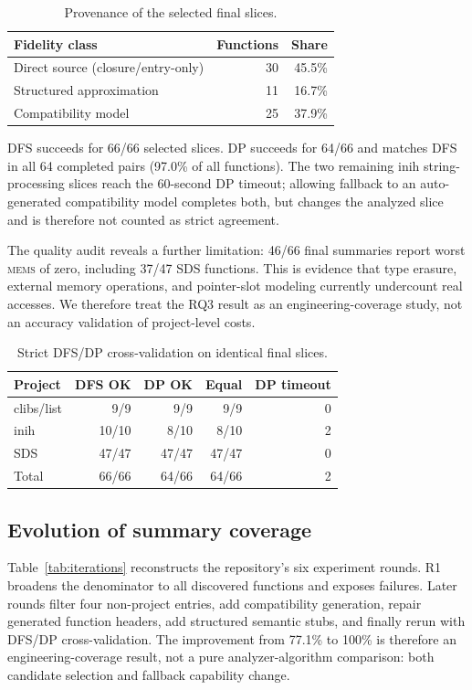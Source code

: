 \documentclass[10pt,conference]{IEEEtran}
\newcommand{\mems}{\textsc{mems}\xspace}
\begin{document}
\begin{table}[t]
\centering
\caption{Provenance of the selected final slices.}
\label{tab:fidelity}
\begin{tabular}{lrr}
\toprule
Fidelity class & Functions & Share\\
\midrule
Direct source (closure/entry-only) & 30 & 45.5\%\\
Structured approximation & 11 & 16.7\%\\
Compatibility model & 25 & 37.9\%\\
\bottomrule
\end{tabular}
\end{table}

DFS succeeds for 66/66 selected slices. DP succeeds for 64/66 and matches DFS in all 64 completed pairs (97.0\% of all functions). The two remaining inih string-processing slices reach the 60-second DP timeout; allowing fallback to an auto-generated compatibility model completes both, but changes the analyzed slice and is therefore not counted as strict agreement.

The quality audit reveals a further limitation: 46/66 final summaries report worst \mems{} of zero, including 37/47 SDS functions. This is evidence that type erasure, external memory operations, and pointer-slot modeling currently undercount real accesses. We therefore treat the RQ3 result as an engineering-coverage study, not an accuracy validation of project-level costs.

\begin{table}[t]
\centering
\caption{Strict DFS/DP cross-validation on identical final slices.}
\label{tab:cross}
\begin{tabular}{lrrrr}
\toprule
Project & DFS OK & DP OK & Equal & DP timeout\\
\midrule
clibs/list & 9/9 & 9/9 & 9/9 & 0\\
inih & 10/10 & 8/10 & 8/10 & 2\\
SDS & 47/47 & 47/47 & 47/47 & 0\\
\midrule
Total & 66/66 & 64/66 & 64/66 & 2\\
\bottomrule
\end{tabular}
\end{table}

\subsection{Evolution of summary coverage}
Table~\ref{tab:iterations} reconstructs the repository's six experiment rounds. R1 broadens the denominator to all discovered functions and exposes failures. Later rounds filter four non-project entries, add compatibility generation, repair generated function headers, add structured semantic stubs, and finally rerun with DFS/DP cross-validation. The improvement from 77.1\% to 100\% is therefore an engineering-coverage result, not a pure analyzer-algorithm comparison: both candidate selection and fallback capability change.
\end{document}
